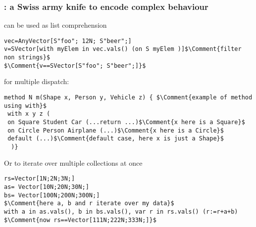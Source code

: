 \begin{frame}[fragile]
\frametitle{\Q@with@: a Swiss army knife to encode complex behaviour}
\Q@with@ can be used as list comprehension
\begin{NiceCode}{59ex}{0.8}
\begin{lstlisting}
vec=AnyVector[S"foo"; 12N; S"beer";]
v=SVector[with myElem in vec.vals() (on S myElem )]$\Comment{filter non strings}$
$\Comment{v==SVector[S"foo"; S"beer";]}$
\end{lstlisting}
\end{NiceCode}
for multiple dispatch:
\begin{NiceCode}{59ex}{0.8}
\begin{lstlisting}
method N m(Shape x, Person y, Vehicle z) { $\Comment{example of method using with}$
 with x y z (
 on Square Student Car (...return ...)$\Comment{x here is a Square}$
 on Circle Person Airplane (...)$\Comment{x here is a Circle}$
 default (...)$\Comment{default case, here x is just a Shape}$ 
  )}
\end{lstlisting}
\end{NiceCode}
Or to iterate over multiple collections at once
\begin{NiceCode}{59ex}{0.8}
\begin{lstlisting}
rs=Vector[1N;2N;3N;]
as= Vector[10N;20N;30N;]
bs= Vector[100N;200N;300N;]
$\Comment{here a, b and r iterate over my data}$
with a in as.vals(), b in bs.vals(), var r in rs.vals() (r:=r+a+b)
$\Comment{now rs==Vector[111N;222N;333N;]}$
\end{lstlisting}
\end{NiceCode}
\end{frame}

